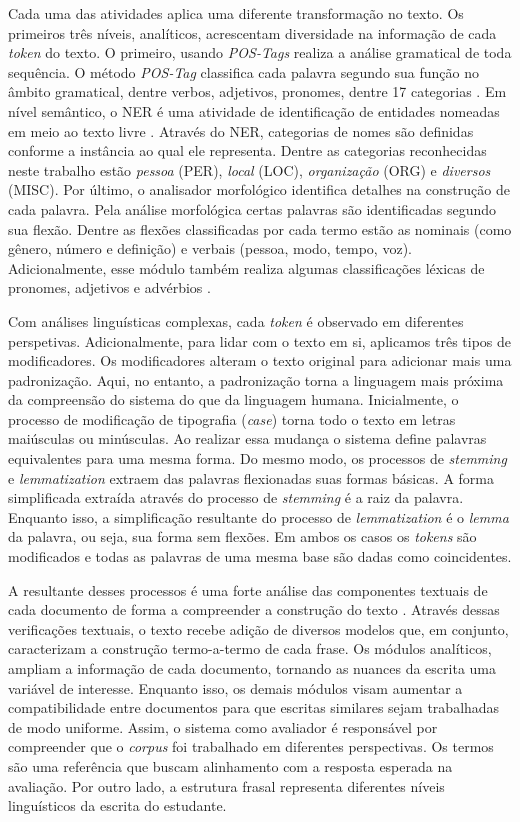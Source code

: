 Cada uma das atividades aplica uma diferente transformação no texto. Os primeiros três níveis, analíticos, acrescentam diversidade na informação de cada \textit{token} do texto. O primeiro, usando \textit{POS-Tags} realiza a análise gramatical de toda sequência. O método \textit{POS-Tag} classifica cada palavra segundo sua função no âmbito gramatical, dentre verbos, adjetivos, pronomes, dentre 17 categorias \cite{marneffe2021}. Em nível semântico, o NER é uma atividade de identificação de entidades nomeadas em meio ao texto livre \cite{pirovani2019}. Através do NER, categorias de nomes são definidas conforme a instância ao qual ele representa. Dentre as categorias reconhecidas neste trabalho estão \textit{pessoa} (PER), \textit{local} (LOC), \textit{organização} (ORG) e \textit{diversos} (MISC). Por último, o analisador morfológico identifica detalhes na construção de cada palavra. Pela análise morfológica certas palavras são identificadas segundo sua flexão. Dentre as flexões classificadas por cada termo estão as nominais (como gênero, número e definição) e verbais (pessoa, modo, tempo, voz). Adicionalmente, esse módulo também realiza algumas classificações léxicas de pronomes, adjetivos e advérbios \cite{marneffe2021}.

Com análises linguísticas complexas, cada \textit{token} é observado em diferentes perspetivas. Adicionalmente, para lidar com o texto em si, aplicamos três tipos de modificadores. Os modificadores alteram o texto original para adicionar mais uma padronização. Aqui, no entanto, a padronização torna a linguagem mais próxima da compreensão do sistema do que da linguagem humana. Inicialmente, o processo de modificação de tipografia (\textit{case}) torna todo o texto em letras maiúsculas ou minúsculas. Ao realizar essa mudança o sistema define palavras equivalentes para uma mesma forma. Do mesmo modo, os processos de \textit{stemming} e \textit{lemmatization} extraem das palavras flexionadas suas formas básicas. A forma simplificada extraída através do processo de \textit{stemming} é a raiz da palavra. Enquanto isso, a simplificação resultante do processo de \textit{lemmatization} é o \textit{lemma} da palavra, ou seja, sua forma sem flexões. Em ambos os casos os \textit{tokens} são modificados e todas as palavras de uma mesma base são dadas como coincidentes.

A resultante desses processos é uma forte análise das componentes textuais de cada documento de forma a compreender a construção do texto \cite{spalenza2020}. Através dessas verificações textuais, o texto recebe adição de diversos modelos que, em conjunto, caracterizam a construção termo-a-termo de cada frase. Os módulos analíticos, ampliam a informação de cada documento, tornando as nuances da escrita uma variável de interesse. Enquanto isso, os demais módulos visam aumentar a compatibilidade entre documentos para que escritas similares sejam trabalhadas de modo uniforme. Assim, o sistema como avaliador é responsável por compreender que o \textit{corpus} foi trabalhado em diferentes perspectivas. Os termos são uma referência que buscam alinhamento com a resposta esperada na avaliação. Por outro lado, a estrutura frasal representa diferentes níveis linguísticos da escrita do estudante.

